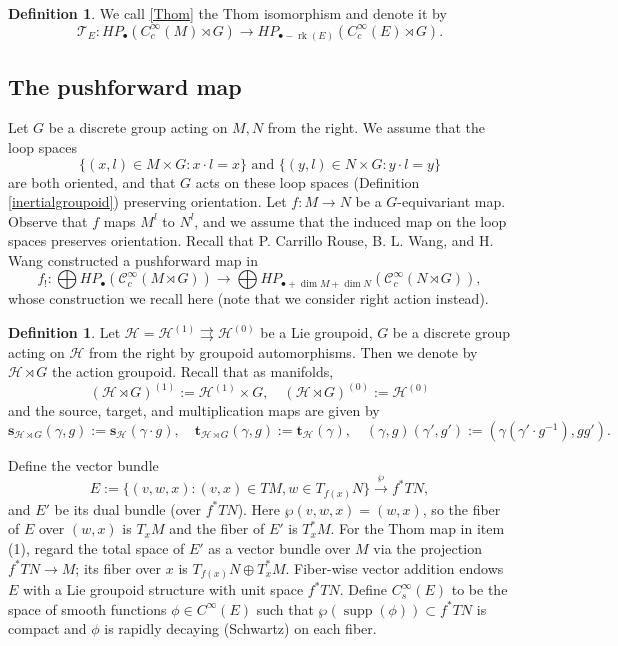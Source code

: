 \documentclass[a4paper]{amsart}
\newcommand{\supp}{\operatorname{supp}}
\newcommand{\rk}{\operatorname{rk}}
\newcommand{\maC}{\mathcal C}
\newcommand{\maH}{\mathcal H}
\newcommand{\maT}{\mathcal T}
\newcommand{\bs}{\mathbf{s}}
\newcommand{\bt}{\mathbf{t}}
\newcommand\<{\langle}
\renewcommand\>{\rangle}
\theoremstyle{definition}
\newtheorem{dfn}[theorem]{Definition}
\theoremstyle{remark}
\begin{document}
\begin{dfn}
We call \eqref{Thom} the Thom isomorphism and denote it by
$$ \maT _E : H P _{\bullet} (C^\infty _c (M) \rtimes G) \to  H P _{\bullet - \rk (E)} (C^\infty _c (E) \rtimes G). $$
\end{dfn}

\subsection{The pushforward map}
Let $G$ be a discrete group acting on $M, N$ from the right.
We assume that the loop spaces
$$\{ (x, l) \in M \times G : x \cdot l = x \} \text{ and } \{ (y, l) \in N \times G : y \cdot l = y \} $$
are both oriented, and that $G$ acts on these loop spaces (Definition \ref{inertialgroupoid}) preserving orientation.
Let $f : M \to N$ be a $G$-equivariant map.
Observe that $f$ maps $M^l$ to $N^l$, and we assume that the induced map on the loop spaces preserves orientation.
Recall that P. Carrillo Rouse, B. L. Wang, and H. Wang constructed a pushforward map in \cite{CRWW23}
$$f_! : \bigoplus H P _\bullet (\maC^\infty _c (M \rtimes G))
\to \bigoplus H P _{\bullet + \dim M + \dim N} (\maC^\infty _c (N \rtimes G)), $$
whose construction we recall here (note that we consider right action instead).

\begin{dfn}
Let $\maH = \maH ^{(1)} \rightrightarrows \maH ^{(0)}$ be a Lie groupoid,
$G$ be a discrete group acting on $\maH$ from the right by groupoid automorphisms.
Then we denote by $\maH \rtimes G$ the action groupoid.
Recall that as manifolds,
$$(\maH \rtimes G)^{(1)} := \maH ^{(1)} \times G, \quad (\maH \rtimes G)^{(0)} := \maH ^{(0)} $$
and the source, target, and multiplication maps are given by
$$ \bs _{\maH \rtimes G} (\gamma, g) := \bs _\maH (\gamma \cdot g), \quad
\bt _{\maH \rtimes G} (\gamma, g) := \bt _\maH (\gamma), \quad
(\gamma , g) (\gamma' , g') := (\gamma ( \gamma' \cdot g^{-1}), g g').$$
\end{dfn}

Define the vector bundle
$$E := \{ (v, w, x) : (v, x) \in T M, w \in T _{f (x)} N \} \xrightarrow{\wp} f ^* T N,$$
and $E'$ be its dual bundle (over $f^* T N$).
Here $\wp(v,w,x)=(w,x)$, so the fiber of $E$ over $(w,x)$ is $T_xM$ and the fiber of $E'$ is $T_x^*M$.
For the Thom map in item (1), regard the total space of $E'$ as a vector bundle over $M$ via the projection $f^*TN \to M$;
its fiber over $x$ is $T_{f(x)}N \oplus T_x^*M$.
Fiber-wise vector addition endows $E$ with a Lie groupoid structure with unit space $f ^* T N$.
Define $C^\infty _s (E)$ to be the space of smooth functions $\phi \in C^\infty (E)$
such that $\wp (\supp (\phi)) \subset f ^* T N$ is compact and $\phi$ is rapidly decaying (Schwartz) on each fiber.
\end{document}
